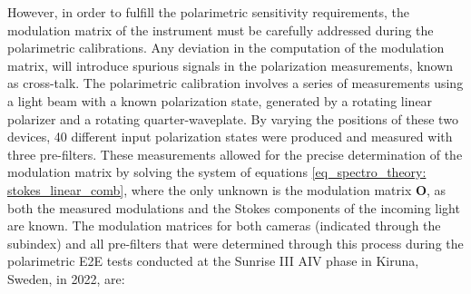 However, in order to fulfill the polarimetric sensitivity requirements, the modulation matrix of the instrument must be carefully addressed during the polarimetric calibrations. Any deviation in the computation of the modulation matrix, will introduce spurious signals in the polarization measurements, known as cross-talk. The polarimetric calibration involves a series of measurements using a light beam with a known polarization state, generated by a rotating linear polarizer and a rotating quarter-waveplate. By varying the positions of these two devices, 40 different input polarization states were produced and measured with three pre-filters. These measurements allowed for the precise determination of the modulation matrix by solving the system of equations \eqref{eq_spectro_theory: stokes_linear_comb}, where the only unknown is the modulation matrix $\textbf{O}$, as both the measured modulations and the Stokes components of the incoming light are known. The modulation matrices for both cameras (indicated through the subindex) and all pre-filters that were determined through this process during the polarimetric E2E tests conducted at the Sunrise III AIV phase in Kiruna, Sweden, in 2022, are:
